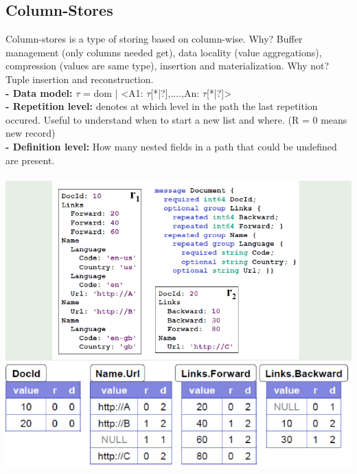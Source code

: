 \documentclass{article}
\begin{document}
\subsection{Column-Stores}
Column-stores is a type of storing based on column-wise. Why? Buffer management (only columns needed get), data locality (value aggregations), compression (values are same type), insertion and materialization. Why not? Tuple insertion and reconstruction.\\
\textbf{- Data model: }$\tau$ = dom | <A1: $\tau$[*|?],....,An: $\tau$[*|?]>\\
\textbf{- Repetition level:} denotes at which level in the path the last repetition occured. Useful to understand when to start a new list and where. (R = 0 means new record)\\
\textbf{- Definition level:} How many nested fields in a path that could be undefined are present.\\\\
\includegraphics[scale=0.6]{31.png}\\\\
\end{document}
